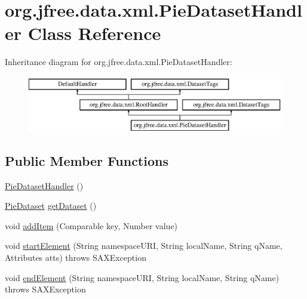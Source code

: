 \hypertarget{classorg_1_1jfree_1_1data_1_1xml_1_1_pie_dataset_handler}{}\section{org.\+jfree.\+data.\+xml.\+Pie\+Dataset\+Handler Class Reference}
\label{classorg_1_1jfree_1_1data_1_1xml_1_1_pie_dataset_handler}
Inheritance diagram for org.\+jfree.\+data.\+xml.\+Pie\+Dataset\+Handler\+:\begin{figure}[H]
\begin{center}
\leavevmode
\includegraphics[height=2.456140cm]{classorg_1_1jfree_1_1data_1_1xml_1_1_pie_dataset_handler}
\end{center}
\end{figure}
\subsection*{Public Member Functions}
\begin{DoxyCompactItemize}
\item 
\mbox{\hyperlink{classorg_1_1jfree_1_1data_1_1xml_1_1_pie_dataset_handler_af212ab55ac56e610e6b4b624916eef79}{Pie\+Dataset\+Handler}} ()
\item 
\mbox{\hyperlink{interfaceorg_1_1jfree_1_1data_1_1general_1_1_pie_dataset}{Pie\+Dataset}} \mbox{\hyperlink{classorg_1_1jfree_1_1data_1_1xml_1_1_pie_dataset_handler_a256bb0e0740bffa708d2513f71d85aad}{get\+Dataset}} ()
\item 
void \mbox{\hyperlink{classorg_1_1jfree_1_1data_1_1xml_1_1_pie_dataset_handler_a81caed22b52a6dee2032c780433dfa86}{add\+Item}} (Comparable key, Number value)
\item 
void \mbox{\hyperlink{classorg_1_1jfree_1_1data_1_1xml_1_1_pie_dataset_handler_ada2443aae345f47c21a926be2909bcce}{start\+Element}} (String namespace\+U\+RI, String local\+Name, String q\+Name, Attributes atts)  throws S\+A\+X\+Exception 
\item 
void \mbox{\hyperlink{classorg_1_1jfree_1_1data_1_1xml_1_1_pie_dataset_handler_a68ce523e1819b6044e7177eb35bac7ed}{end\+Element}} (String namespace\+U\+RI, String local\+Name, String q\+Name)  throws S\+A\+X\+Exception 
\end{DoxyCompactItemize}
